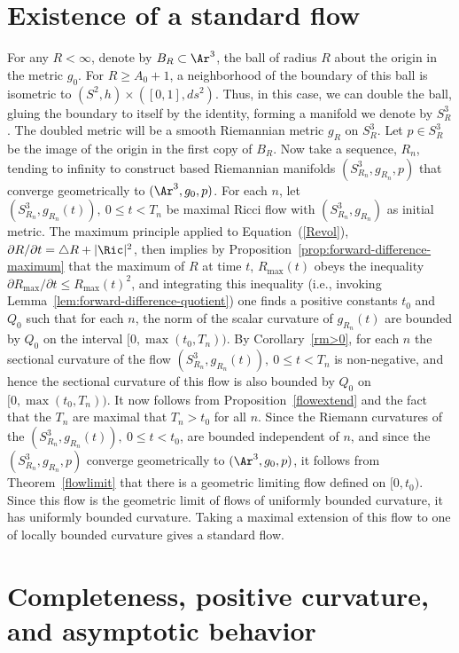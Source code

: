 \section{Existence of a standard flow}

For any $R<\infty$, denote by $B_R\subset \Ar^3$, the ball of radius
$R$ about the origin in the metric $g_0$. For $R\ge A_0+1$,  a
neighborhood of the boundary of this ball is isometric to
$(S^2,h)\times ([0,1],ds^2)$. Thus, in this case, we can double the
ball, gluing the boundary to itself by the identity, forming a
manifold we denote by $S^3_R$. The doubled metric will be a smooth
Riemannian metric $g_R$ on $S^3_R$. Let $p\in S^3_R$ be the image of
the origin in the first copy of $B_R$. Now take a sequence, $R_n$,
tending to infinity to construct based Riemannian manifolds
$(S^3_{R_n},g_{R_n},p)$ that converge geometrically to
$(\Ar^3,g_0,p)$. For each $n$, let $(S^3_{R_n},g_{R_n}(t)),\ 0\le
t<T_n$ be maximal Ricci flow with $(S^3_{R_n},g_{R_n})$ as initial
metric.
 The maximum principle
applied to Equation~(\ref{Revol}), $\partial R/\partial t=\triangle
R+|\Ric|^2$, then implies by Proposition~\ref{prop:forward-difference-maximum} that
the maximum of $R$ at time $t$, $R_{\max}(t)$ obeys the
inequality $\partial R_{\max}/\partial t\le R_{\max}(t)^2$,
and integrating this inequality (i.e., invoking
Lemma~\ref{lem:forward-difference-quotient}) one finds a positive constants $t_0$ and
$Q_0$ such that for each $n$, the norm of the scalar curvature of
$g_{R_n}(t)$ are bounded by $Q_0$ on the interval $[0,\max(t_0,T_n))$. By Corollary~\ref{rm>0}, for each $n$ the sectional
curvature of the flow $(S^3_{R_n},g_{R_n}(t)),\ 0\le t<T_n$ is
non-negative, and hence the sectional curvature of  this flow is
also bounded by $Q_0$ on $[0,\max(t_0,T_n))$. It now follows
from Proposition~\ref{flowextend} and the fact that the $T_n$ are
maximal that $T_n>t_0$ for all $n$.
 Since the Riemann
curvatures of the $(S^3_{R_n},g_{R_n}(t)),\ 0\le t<t_0$, are bounded
independent of $n$, and since the $(S^3_{R_n},g_{R_n},p)$ converge
geometrically to $(\Ar^3,g_0,p)$, it follows from
Theorem~\ref{flowlimit} that there is a geometric limiting flow
defined on $[0,t_0)$. Since this flow is the geometric limit of
flows of uniformly bounded curvature, it has uniformly bounded
curvature. Taking a maximal extension of this flow to one of locally
bounded curvature gives a standard flow.



\section{Completeness, positive curvature, and asymptotic behavior}

